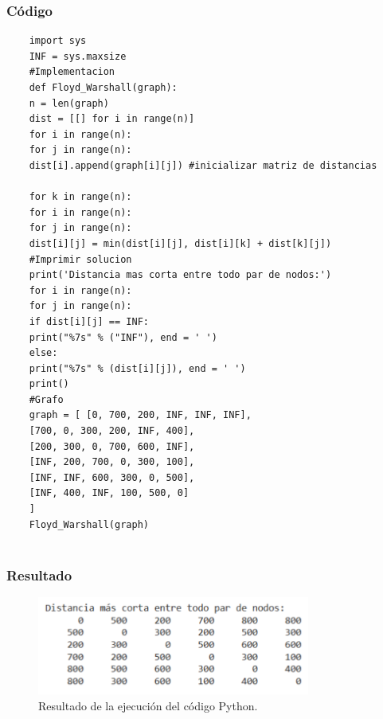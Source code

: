 \subsubsection{Código}
\begin{lstlisting}
	import sys
	INF = sys.maxsize
	#Implementacion
	def Floyd_Warshall(graph):
	n = len(graph)
	dist = [[] for i in range(n)]
	for i in range(n):
	for j in range(n):
	dist[i].append(graph[i][j]) #inicializar matriz de distancias
	
	for k in range(n):
	for i in range(n):
	for j in range(n):
	dist[i][j] = min(dist[i][j], dist[i][k] + dist[k][j])
	#Imprimir solucion
	print('Distancia mas corta entre todo par de nodos:')
	for i in range(n):
	for j in range(n):
	if dist[i][j] == INF:
	print("%7s" % ("INF"), end = ' ')
	else:
	print("%7s" % (dist[i][j]), end = ' ')
	print()
	#Grafo
	graph = [ [0, 700, 200, INF, INF, INF],
	[700, 0, 300, 200, INF, 400],
	[200, 300, 0, 700, 600, INF],
	[INF, 200, 700, 0, 300, 100],
	[INF, INF, 600, 300, 0, 500],
	[INF, 400, INF, 100, 500, 0]
	]
	Floyd_Warshall(graph)
	
\end{lstlisting}

\subsubsection{Resultado}
\begin{figure}[H]
	\centering
	\includegraphics[width=0.8\textwidth]{resultado_distancias_ejem1.png}
	\caption{Resultado de la ejecución del código Python.}
	\label{fig:resultado}
\end{figure}

